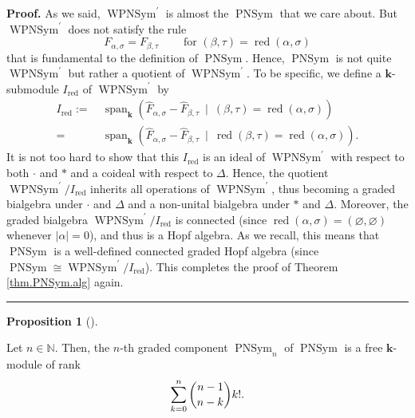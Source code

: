 \documentclass[numbers=enddot,12pt,final,onecolumn,notitlepage]{scrartcl}%
\theoremstyle{definition}
\newtheorem{prop}[theo]{Proposition}
\newenvironment{proposition}[1][]
{\begin{prop}[#1]\begin{leftbar}}
{\end{leftbar}\end{prop}}
\newenvironment{proof}[1][Proof]{\noindent\textbf{#1.} }{\ \rule{0.5em}{0.5em}}
\let\sumnonlimits\sum
\renewcommand{\sum}{\sumnonlimits\limits}
\begin{document}
\begin{proof}
As we said, $\operatorname*{WPNSym}\nolimits^{\prime}$ is almost the
$\operatorname*{PNSym}$ that we care about. But $\operatorname*{WPNSym}%
\nolimits^{\prime}$ does not satisfy the rule%
\[
F_{\alpha,\sigma}=F_{\beta,\tau}\ \ \ \ \ \ \ \ \ \ \text{for }\left(
\beta,\tau\right)  =\operatorname*{red}\left(  \alpha,\sigma\right)
\]
that is fundamental to the definition of $\operatorname*{PNSym}$. Hence,
$\operatorname*{PNSym}$ is not quite $\operatorname*{WPNSym}\nolimits^{\prime
}$ but rather a quotient of $\operatorname*{WPNSym}\nolimits^{\prime}$. To be
specific, we define a $\mathbf{k}$-submodule $I_{\operatorname*{red}}$ of
$\operatorname*{WPNSym}\nolimits^{\prime}$ by
\begin{align*}
I_{\operatorname*{red}}:=  &  \ \operatorname*{span}\nolimits_{\mathbf{k}%
}\left(  \widehat{F}_{\alpha,\sigma}-\widehat{F}_{\beta,\tau}\ \mid\ \left(
\beta,\tau\right)  =\operatorname*{red}\left(  \alpha,\sigma\right)  \right)
\\
=  &  \ \operatorname*{span}\nolimits_{\mathbf{k}}\left(  \widehat{F}%
_{\alpha,\sigma}-\widehat{F}_{\beta,\tau}\ \mid\ \operatorname*{red}\left(
\beta,\tau\right)  =\operatorname*{red}\left(  \alpha,\sigma\right)  \right)
.
\end{align*}
It is not too hard to show that this $I_{\operatorname*{red}}$ is an ideal of
$\operatorname*{WPNSym}\nolimits^{\prime}$ with respect to both $\cdot$ and
$\ast$ and a coideal with respect to $\Delta$. Hence, the quotient
$\operatorname*{WPNSym}\nolimits^{\prime}/I_{\operatorname*{red}}$ inherits
all operations of $\operatorname*{WPNSym}\nolimits^{\prime}$, thus becoming a
graded bialgebra under $\cdot$ and $\Delta$ and a non-unital bialgebra under
$\ast$ and $\Delta$. Moreover, the graded bialgebra $\operatorname*{WPNSym}%
\nolimits^{\prime}/I_{\operatorname*{red}}$ is connected (since
$\operatorname*{red}\left(  \alpha,\sigma\right)  =\left(  \varnothing
,\varnothing\right)  $ whenever $\left\vert \alpha\right\vert =0$), and thus
is a Hopf algebra. As we recall, this means that $\operatorname*{PNSym}$ is a
well-defined connected graded Hopf algebra (since $\operatorname*{PNSym}%
\cong\operatorname*{WPNSym}\nolimits^{\prime}/I_{\operatorname*{red}}$). This
completes the proof of Theorem \ref{thm.PNSym.alg} again.
\end{proof}

\begin{proposition}
\label{prop.PNSym.rank}Let $n\in\mathbb{N}$. Then, the $n$-th graded component
$\operatorname*{PNSym}\nolimits_{n}$ of $\operatorname*{PNSym}$ is a free
$\mathbf{k}$-module of rank
\[
\sum_{k=0}^{n}\dbinom{n-1}{n-k}k!.
\]

\end{proposition}
\end{document}
